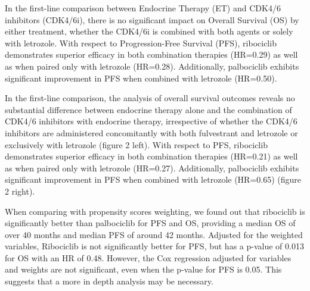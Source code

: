 In the first-line comparison between Endocrine Therapy (ET) and CDK4/6 inhibitors (CDK4/6i), there is no significant impact on Overall Survival (OS) by either treatment, whether the CDK4/6i is combined with both agents or solely with letrozole. With respect to Progression-Free Survival (PFS), ribociclib demonstrates superior efficacy in both combination therapies (HR=0.29) as well as when paired only with letrozole (HR=0.28). Additionally, palbociclib exhibits significant improvement in PFS when combined with letrozole (HR=0.50).

In the first-line comparison, the analysis of overall survival outcomes reveals no substantial difference between endocrine therapy alone and the combination of CDK4/6 inhibitors with endocrine therapy, irrespective of whether the CDK4/6 inhibitors are administered concomitantly with both fulvestrant and letrozole or exclusively with letrozole (figure 2 left). With respect to PFS, ribociclib demonstrates superior efficacy in both combination therapies (HR=0.21) as well as when paired only with letrozole (HR=0.27). Additionally, palbociclib exhibits significant improvement in PFS when combined with letrozole (HR=0.65) (figure 2 right).


When comparing with propensity scores weighting, we found out that ribociclib is significantly better than palbociclib for PFS and OS, providing a median OS of over 40 months and median PFS of around 42 months. Adjusted for the weighted variables, Ribociclib is not significantly better for PFS, but has a p-value of 0.013 for OS with an HR of 0.48. However, the Cox regression adjusted for variables and weights are not significant, even when the p-value for PFS is 0.05. This suggests that a more in depth analysis may be necessary.


